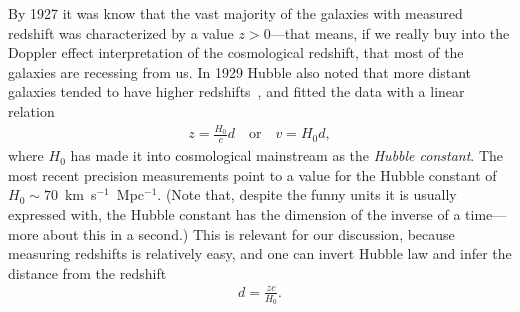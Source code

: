 By 1927 it was know that the vast majority of the galaxies with measured redshift
was characterized by a value $z > 0$---that means, if we really buy into the Doppler
effect interpretation of the cosmological redshift, that most of the galaxies are
recessing from us. In 1929 Hubble also noted that more distant galaxies tended to
have higher redshifts~\cite{1929PNAS...15..168H}, and fitted the data with a linear relation
\begin{align}
	z = \frac{H_0}{c}d \quad\text{or}\quad v = H_0 d,
\end{align}
where $H_0$ has made it into cosmological mainstream as the \emph{Hubble constant}.
The most recent precision measurements point to a value for the Hubble constant of
$H_0 \sim 70$~km~s$^{-1}$~Mpc$^{-1}$. (Note that, despite the funny units it is
usually expressed with, the Hubble constant has the dimension of the inverse of a
time---more about this in a second.) This is relevant for our discussion, because
measuring redshifts is relatively easy, and one can invert Hubble law and infer
the distance from the redshift
\begin{align*}
  d = \frac{zc}{H_0}.
\end{align*}


